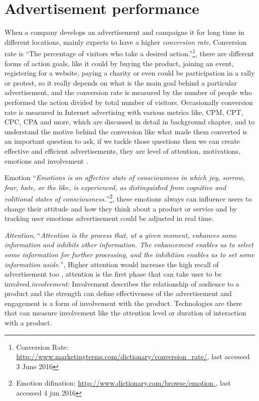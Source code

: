 \section{Advertisement performance}
When a company develops an advertisement and campaigns it for long time in different locations, mainly expects to have a higher \emph{conversion rate}, Conversion rate is ``{The percentage of visitors who take a desired action.}''\footnote{Conversion Rate: \url{ http://www.marketingterms.com/dictionary/conversion_rate/}, last accessed 3 June 2016}, there are different forms of action goals, like it could by buying the product, joining an event, registering for a website, paying a charity or even could be participation in a rally or protest, so it really depends on what is the main goal behind a particular advertisement, and the conversion rate is measured by the number of people who performed the action divided by total number of visitors. Occasionally conversion rate is measured in Internet advertising with various metrics like, CPM, CPT, CPC, CPA and more, which are discussed in detail in background chapter, and to understand the motive behind the conversion like what made them converted is an important question to ask, if we tackle those questions then we can create effective and efficient advertisements, they are level of attention, motivations, emotions and involvement \cite{pervasiv_ad}.

Emotion ``\emph{Emotions is an affective state of consciousness in which joy, sorrow, fear, hate, or the like, is experienced, as distinguished from cognitive and volitional states of consciousness.}''\footnote{Emotion difination: \url{ http://www.dictionary.com/browse/emotion }, last accessed 4 jun 2016}, these emotions always can influence users to change their attitude and how they think about a product or service and by tracking user emotions advertisement could be adjusted in real time.

\emph{Attention}, ``\emph{Attention is the process that, at a given moment, enhances some information and inhibits other information. The enhancement enables us to select some information for further processing, and the inhibition enables us to set some information aside.}''\cite{Attention}, Higher attention would increase the high recall of advertisement too \cite{add_effectivenss}, attention is the first phase that can take user to be involved.\emph{involvement: } Involvement describes the relationship of audience to a product and the strength can define effectiveness of the advertisement and engagement is a form of involvement with the product. Technologies are there that can measure involvement like the attention level or duration of interaction with a product.


